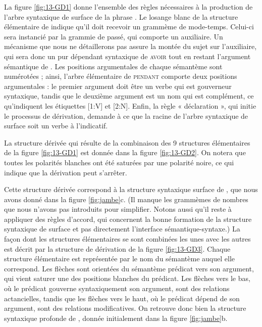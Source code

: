 {La figure \ref{fig:13-GD1} donne l’ensemble des règles nécessaires à la production de l’arbre syntaxique de surface de la phrase . Le losange blanc de la structure élémentaire de  indique qu’il doit recevoir un grammème de mode-temps. Celui-ci sera instancié par la grammie de passé, qui comporte un auxiliaire. Un mécanisme que nous ne détaillerons pas assure la montée du sujet sur l’auxiliaire, qui sera donc un pur dépendant syntaxique de \textsc{avoir} tout en restant l’argument sémantique de . Les positions argumentales de chaque sémantème sont numérotées ; ainsi, l’arbre élémentaire de \textsc{pendant} comporte deux positions argumentales : le premier argument doit être un verbe qui est gouverneur syntaxique, tandis que le deuxième argument est un nom qui est complément, ce qu’indiquent les étiquettes [1{\NoAutoSpacing :}V] et [2{\NoAutoSpacing :}N]. Enfin, la règle « déclaration », qui initie le processus de dérivation, demande à ce que la racine de l’arbre syntaxique de surface soit un verbe à l’indicatif.

La structure dérivée qui résulte de la combinaison des 9 structures élémentaires de la figure \ref{fig:13-GD1} est donnée dans la figure \ref{fig:13-GD2}. On notera que toutes les polarités blanches ont été saturées par une polarité noire, ce qui indique que la dérivation peut s’arrêter.

Cette structure dérivée correspond à la structure syntaxique surface de , que nous avons donné dans la figure \ref{fig:jambe}c. (Il manque les grammèmes de nombres que nous n'avons pas introduits pour simplifier. Notons aussi qu'il reste à appliquer des règles d'accord, qui concernent la bonne formation de la structure syntaxique de surface et pas directement l'interface sémantique-syntaxe.) La façon dont les structures élémentaires se sont combinées les unes avec les autres est décrit par la structure de dérivation de la figure \ref{fig:13-GD3}. Chaque structure élémentaire est représentée par le nom du sémantème auquel elle correspond.  Les flèches sont orientées du sémantème prédicat vers son argument, qui vient saturer une des positions blanches du prédicat. Les flèches vers le bas, où le prédicat gouverne syntaxiquement son argument, sont des relations actancielles, tandis que les flèches vers le haut, où le prédicat dépend de son argument, sont des relations modificatives. On retrouve donc bien la structure syntaxique profonde de , donnée initialement dans la figure \ref{fig:jambe}b.


}
